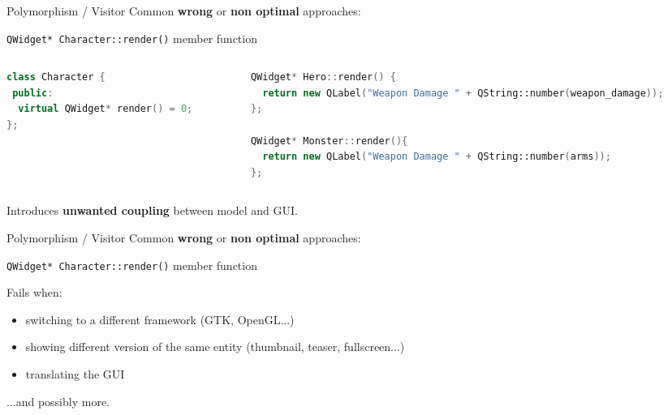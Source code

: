 \documentclass[11pt]{beamer}
\renewcommand{\emph}[1]{\textbf{#1}}
\begin{document}
\begin{frame}[fragile]{Polymorphism / Visitor}
 Common \emph{wrong} or \emph{non optimal} approaches:
 
 \begin{center}
  \texttt{QWidget* Character::render()} member function
 \end{center}
 
 \begin{columns}
  \begin{column}{0.54\textwidth}
   \begin{lstlisting}[language=C++]
class Character {
 public:
  virtual QWidget* render() = 0;
};
\end{lstlisting}
  \end{column}
  \begin{column}{0.46\textwidth}
   \begin{lstlisting}[language=C++]
QWidget* Hero::render() {
  return new QLabel("Weapon Damage " + QString::number(weapon_damage));
};

QWidget* Monster::render(){
  return new QLabel("Weapon Damage " + QString::number(arms));
};
\end{lstlisting}
  \end{column}
 \end{columns}

 Introduces \emph{unwanted coupling} between model and GUI.
\end{frame}

\begin{frame}[fragile]{Polymorphism / Visitor}
 Common \emph{wrong} or \emph{non optimal} approaches:
 
 \begin{center}
  \texttt{QWidget* Character::render()} member function
 \end{center}
 
 Fails when:
 \begin{itemize}
  \item switching to a different framework (GTK, OpenGL...)
  \item showing different version of the same entity (thumbnail, teaser, fullscreen...)
  \item translating the GUI
 \end{itemize}
 
 ...and possibly more.
\end{frame}
\end{document}
